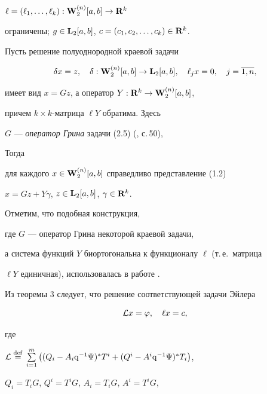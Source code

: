 $\ell=(\ell_1,\dotsc,\ell_k):\bold W{}_2^{(n)}[a,b]\to\bold R{}^k$


ограничены; $g\in\bold L{}_2[a,b]$, $c=(c_1,c_2,\dotsc,c_k)\in\bold R{}^k$.





Пусть решение полуоднородной краевой задачи


\begin{equation}


\delta x=z,\quad


\delta:\spc{W}_2^{(n)}[a,b]\to\spc{L}_2[a,b],\quad


\ell_j x=0,\quad j=\overline{1,n},


\end{equation}


имеет вид $x=Gz$, а оператор $Y:\bold R{}^k\to\bold W{}_2^{(n)}[a,b]$,


причем $k\times k$-матрица $\ell Y$ обратима. Здесь


$G$ --- {\it оператор Грина} задачи (2.5) (\cite{AMR}, с.\,50),


Тогда


для каждого $x\in\bold W{}_2^{(n)}[a,b]$ справедливо представление (1.2)


$x=Gz+Y\gamma$, $z\in\bold L{}_2[a,b]$, $\gamma\in\bold R{}^k$.





Отметим, что подобная конструкция,


где $G$ --- оператор Грина некоторой краевой задачи,


а система функций $Y$ биортогональна к функционалу $\ell$ (т.\,е.~матрица


$\ell Y$ единичная), использовалась в работе \cite{G}.





Из теоремы 3 следует, что решение соответствующей задачи Эйлера


\begin{equation}


{\cal L}x=\varphi,\quad \ell x=c,


\end{equation}


где


${\cal L}\eqdef\sum\limits_{i=1}^m\big((Q_i-A_i\q^{-1}\Psi)^*T^i+


(Q^i-A^i\q^{-1}\Psi)^*T_i\big)$,


$Q_i=T_iG$, $Q^i=T^iG$, $A_i=T_iG$, $A^i=T^iG$,


